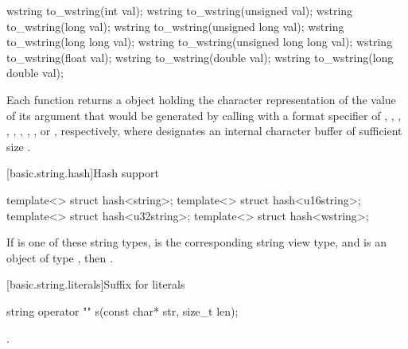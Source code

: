 %
\begin{itemdecl}
wstring to_wstring(int val);
wstring to_wstring(unsigned val);
wstring to_wstring(long val);
wstring to_wstring(unsigned long val);
wstring to_wstring(long long val);
wstring to_wstring(unsigned long long val);
wstring to_wstring(float val);
wstring to_wstring(double val);
wstring to_wstring(long double val);
\end{itemdecl}

\begin{itemdescr}
\pnum
\returns Each function returns a  object holding the character
representation of the value of its argument that would be generated by calling
 with a format specifier of
,
,
,
,
,
,
,
,
or , respectively, where  designates an
internal character buffer of sufficient size .
\end{itemdescr}

[basic.string.hash]{Hash support}

%
%
%
%
\begin{itemdecl}
template<> struct hash<string>;
template<> struct hash<u16string>;
template<> struct hash<u32string>;
template<> struct hash<wstring>;
\end{itemdecl}

\begin{itemdescr}
\pnum
If  is one of these string types,
 is the corresponding string view type, and
 is an object of type ,
then .
\end{itemdescr}

[basic.string.literals]{Suffix for  literals}

%
\begin{itemdecl}
string operator "" s(const char* str, size_t len);
\end{itemdecl}

\begin{itemdescr}
\pnum
\returns
{}.
\end{itemdescr}

